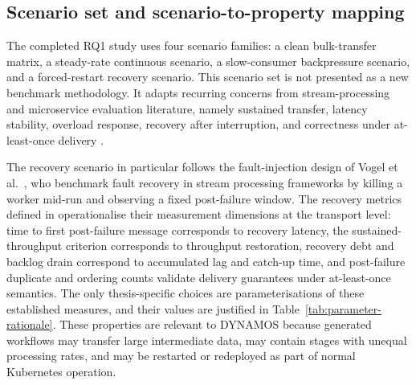 \subsection{Scenario set and scenario-to-property mapping}

The completed RQ1 study uses four scenario families: a clean bulk-transfer matrix, a steady-rate continuous scenario, a slow-consumer backpressure scenario, and a forced-restart recovery scenario. This scenario set is not presented as a new benchmark methodology. It adapts recurring concerns from stream-processing and microservice evaluation literature, namely sustained transfer, latency stability, overload response, recovery after interruption, and correctness under at-least-once delivery \cite{karimov2018benchmarking,systematicstreaming,ciftci2025ipcmechanisms,vogel2024faultRecovery}.

The recovery scenario in particular follows the fault-injection design of Vogel et al.~\cite{vogel2024faultRecovery}, who benchmark fault recovery in stream processing frameworks by killing a worker mid-run and observing a fixed post-failure window. The recovery metrics defined in  operationalise their measurement dimensions at the transport level: time to first post-failure message corresponds to recovery latency, the sustained-throughput criterion corresponds to throughput restoration, recovery debt and backlog drain correspond to accumulated lag and catch-up time, and post-failure duplicate and ordering counts validate delivery guarantees under at-least-once semantics. The only thesis-specific choices are parameterisations of these established measures, and their values are justified in Table~\ref{tab:parameter-rationale}. These properties are relevant to DYNAMOS because generated workflows may transfer large intermediate data, may contain stages with unequal processing rates, and may be restarted or redeployed as part of normal Kubernetes operation.

